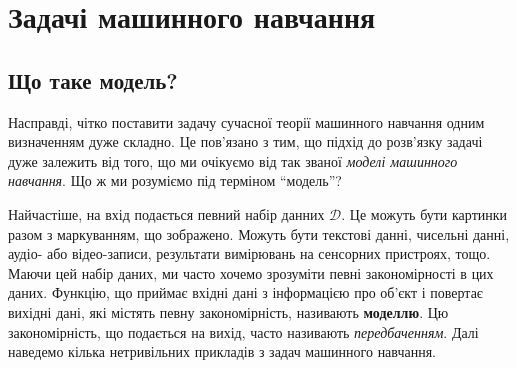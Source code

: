 \usetikzlibrary{positioning, arrows.meta}

\chapter{Задачі машинного навчання}

\section{Що таке модель?}

Насправді, чітко поставити задачу сучасної теорії машинного навчання одним
визначенням дуже складно. Це пов'язано з тим, що підхід до розв'язку задачі дуже
залежить від того, що ми очікуємо від так званої \textit{моделі машинного
навчання}. Що ж ми розуміємо під терміном ``модель''?

Найчастіше, на вхід подається певний набір данних $\mathcal{D}$. Це можуть бути
картинки разом з маркуванням, що зображено. Можуть бути текстові данні, чисельні
данні, аудіо- або відео-записи, результати вимірювань на сенсорних пристроях,
тощо. Маючи цей набір даних, ми часто хочемо зрозуміти певні закономірності в
цих даних. Функцію, що приймає вхідні дані з інформацією про об'єкт і повертає
вихідні дані, які містять певну закономірність, називають \textbf{моделлю}. Цю
закономірність, що подається на вихід, часто називають \textit{передбаченням}.
Далі наведемо кілька нетривільних прикладів з задач машинного навчання.

